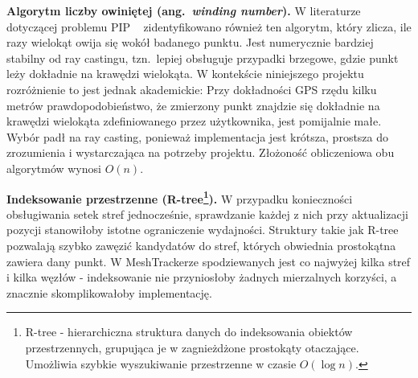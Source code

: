 \textbf{Algorytm liczby owiniętej (ang.\ \textit{winding number}).}
W literaturze dotyczącej problemu PIP ~\cite{shimrat1962} zidentyfikowano również ten algorytm, który zlicza,
ile razy wielokąt owija się wokół badanego punktu. Jest numerycznie bardziej stabilny od
ray castingu, tzn.\ lepiej obsługuje przypadki brzegowe, gdzie punkt leży dokładnie na krawędzi
wielokąta. W kontekście niniejszego projektu rozróżnienie to jest jednak akademickie: Przy dokładności GPS rzędu kilku metrów prawdopodobieństwo, że zmierzony punkt
znajdzie się dokładnie na krawędzi wielokąta zdefiniowanego przez użytkownika, jest
pomijalnie małe. Wybór padł na ray casting, ponieważ implementacja jest krótsza, prostsza do zrozumienia
i wystarczająca na potrzeby projektu. Złożoność obliczeniowa obu algorytmów wynosi $O(n)$.

\textbf{Indeksowanie przestrzenne (R-tree\footnote{R-tree - hierarchiczna struktura danych do indeksowania obiektów przestrzennych, grupująca je w zagnieżdżone prostokąty otaczające. Umożliwia szybkie wyszukiwanie przestrzenne w czasie $O(\log n)$.}).}
W przypadku konieczności obsługiwania setek stref jednocześnie, sprawdzanie każdej z nich przy 
aktualizacji pozycji stanowiłoby istotne ograniczenie wydajności.
Struktury takie jak R-tree pozwalają szybko zawęzić kandydatów do stref, których obwiednia
prostokątna zawiera dany punkt. W MeshTrackerze spodziewanych jest co najwyżej kilka stref
i kilka węzłów - indeksowanie nie przyniosłoby żadnych mierzalnych korzyści, a znacznie
skomplikowałoby implementację.
